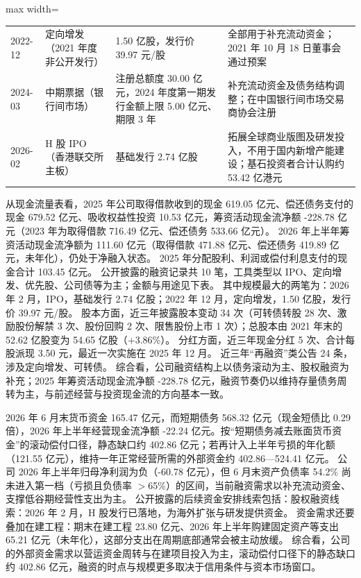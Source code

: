 \begin{center}
\begin{adjustbox}{max width=\textwidth}
\begin{tabular}{@{}p{1.45cm}p{2.55cm}p{4.05cm}p{4.95cm}@{}}
2022-12 & 定向增发（2021 年度非公开发行） & 1.50 亿股，\allowbreak{}发行价 39.97 元/\allowbreak{}股 & 全部用于补充流动资金；2021 年 10 月 18 日董事会通过预案 \\
2024-03 & 中期票据（银行间市场） & 注册总额度 30.00 亿元，\allowbreak{}2024 年度第一期发行金额上限 5.00 亿元、\allowbreak{}期限 3 年 & 补充流动资金及债务结构调整；在中国银行间市场交易商协会注册 \\
2026-02 & H 股 IPO（香港联交所主板） & 基础发行 2.74 亿股 & 拓展全球商业版图及研发投入，\allowbreak{}不用于国内新增产能建设；基石投资者合计认购约 53.42 亿港元 \\
\bottomrule
\end{tabular}
\end{adjustbox}
\end{center}

 从现金流量表看，2025 年公司取得借款收到的现金 619.05 亿元、偿还债务支付的现金 679.52 亿元、吸收权益性投资 10.53 亿元，筹资活动现金流净额 -228.78 亿元（2023 年为取得借款 716.49 亿元、偿还债务 533.66 亿元）。 2026 年上半年筹资活动现金流净额为 111.60 亿元（取得借款 471.88 亿元、偿还债务 419.89 亿元，未年化），仍处于净融入状态。 2025 年分配股利、利润或偿付利息支付的现金合计 103.45 亿元。 公开披露的融资记录共 10 笔，工具类型以 IPO、定向增发、优先股、公司债等为主；金额与用途见下表。 其中规模最大的两笔为：2026 年 2 月，IPO，基础发行 2.74 亿股；2022 年 12 月，定向增发，1.50 亿股，发行价 39.97 元/股。 股本方面，近三年披露股本变动 34 次（可转债转股 28 次、激励股份解禁 3 次、股份回购 2 次、限售股份上市 1 次）；总股本由 2021 年末的 52.62 亿股变为 54.65 亿股（+3.86\%）。 分红方面，近三年现金分红 5 次、合计每股派现 3.50 元，最近一次实施在 2025 年 12 月。 近三年“再融资”类公告 24 条，涉及定向增发、可转债。 综合看，公司融资结构上以债务滚动为主、股权融资为补充；2025 年筹资活动现金流净额 -228.78 亿元，融资节奏仍以维持存量债务周转为主，与前述经营与投资现金流的方向基本一致。

 2026 年 6 月末货币资金 165.47 亿元，而短期债务 568.32 亿元（现金短债比 0.29 倍），2026 年上半年经营现金流净额 -22.24 亿元。按“短期债务减去账面货币资金”的滚动偿付口径，静态缺口约 402.86 亿元；若再计入上半年亏损的年化额（121.55 亿元），维持一年正常经营所需的外部资金约 402.86---524.41 亿元。 公司 2026 年上半年归母净利润为负（-60.78 亿元），但 6 月末资产负债率 54.2\% 尚未进入第一档（亏损且负债率 $>$65\%）的区间，当前融资需求以补充流动资金、支撑低谷期经营性支出为主。 公开披露的后续资金安排线索包括：股权融资线索：2026 年 2 月，H 股发行已落地，为海外扩张与研发提供资金。 资金需求还要叠加在建工程：期末在建工程 23.80 亿元、2026 年上半年购建固定资产等支出 65.21 亿元（未年化），这部分支出在周期底部通常会被主动放缓。 综合看，公司的外部资金需求以营运资金周转与在建项目投入为主，滚动偿付口径下的静态缺口约 402.86 亿元，融资的时点与规模更多取决于信用条件与资本市场窗口。





